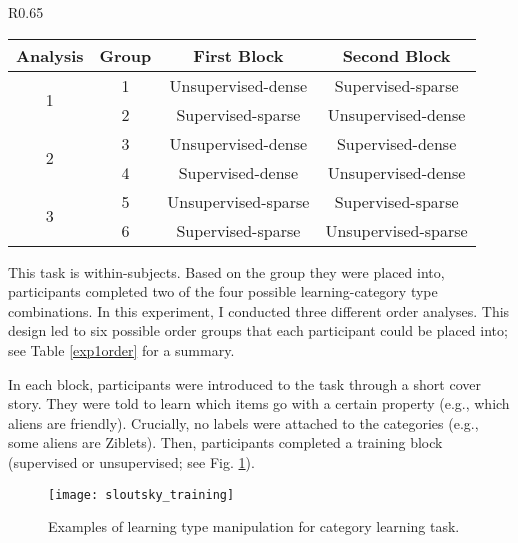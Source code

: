 \documentclass[../dissertation.tex]{subfiles}
\begin{document}
\begin{wraptable}[8]{R}{0.65\linewidth}
\vspace{-10pt}
\caption{Block orders for statistical density task.}
\vspace{-10pt}
\begin{center}
\begin{tabular}{cccc}
 \toprule
 Analysis & Group & First Block & Second Block \\ 
 \midrule
 \multirow{2}{*}{1} & 1 & Unsupervised-dense & Supervised-sparse \\ 
 & 2 & Supervised-sparse & Unsupervised-dense \\ 
 \midrule
  \multirow{2}{*}{2} & 3 & Unsupervised-dense & Supervised-dense \\ 
 & 4 & Supervised-dense & Unsupervised-dense \\
 \midrule
  \multirow{2}{*}{3} & 5 & Unsupervised-sparse & Supervised-sparse \\ 
 & 6 & Supervised-sparse & Unsupervised-sparse \\ 
 \bottomrule 
\end{tabular}
\end{center}
\vspace{-20pt}
\label{exp1order}
\end{wraptable} \par

	This task is within-subjects. Based on the group they were placed into, participants completed two of the four possible learning-category type combinations. In this experiment, I conducted three different order analyses. This design led to six possible order groups that each participant could be placed into; see Table \ref{exp1order} for a summary. \par
 In each block, participants were introduced to the task through a short cover story. They were told to learn which items go with a certain property (e.g., which aliens are friendly). Crucially, no labels were attached to the categories (e.g., some aliens are Ziblets). Then, participants completed a training block (supervised or unsupervised; see Fig. \ref{sloutskytraining}). 

\begin{figure}[h]
\begin{center}
\texttt{[image: sloutsky\_training]}
\caption[Training conditions in category learning task.]{Examples of learning type manipulation for category learning task.}
\vspace{-10pt}
\label{sloutskytraining}
\end{center}
\end{figure}
 
\end{document}
